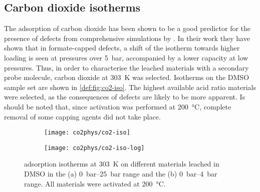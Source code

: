 
\subsection{Carbon dioxide isotherms}\label{def:co2}

The adsorption of carbon dioxide has been shown to be a good 
predictor for the presence of defects from comprehensive simulations
by \citet{thorntonDefectsMetalOrganic2016}.
In their work they have shown that in formate-capped defects, 
a shift of the  isotherm towards
higher loading is seen at pressures over \SI{5}{\bar}, accompanied 
by a lower capacity at low pressures. Thus, in order to characterise
the leached materials with a secondary probe molecule, carbon dioxide
at \SI{303}{\kelvin} was selected. Isotherms on the \gls{DMSO} sample 
set are shown in \autoref{def:fig:co2-iso}. The highest available 
acid ratio materials were selected, as the consequences of defects 
are likely to be more apparent. Is should be noted that, since
activation was performed at \SI{200}{\degreeCelsius}, complete removal 
of some capping agents did not take place.

\begin{figure}[htb]
    \centering

    \begin{subfigure}{0.4\linewidth}
		\texttt{[image: co2phys/co2-iso]}%
		\caption{}%
		\label{def:fig:co2-iso-reg}
	\end{subfigure}%
	\begin{subfigure}{0.4\linewidth}
		\texttt{[image: co2phys/co2-iso-log]}%
		\caption{}%
		\label{def:fig:co2-iso-log}
	\end{subfigure}%

    \caption{
         adsorption isotherms at \SI{303}{\kelvin} on different
        materials leached in \gls{DMSO} in the (a) \SIrange{0}{25}{\bar} range
        and the (b) \SIrange{0}{4}{\bar} range. All materials were 
        activated at \SI{200}{\degreeCelsius}.
    }\label{def:fig:co2-iso}
\end{figure}

